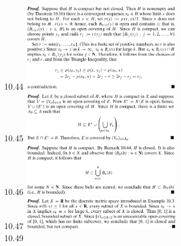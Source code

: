 \documentclass[8pt,landscape]{article}
\begin{document}
\begin{multicols}{3}
    10.44
    \includegraphics[width=250]{10_44.png} \\
    10.45
    \includegraphics[width=250]{10_45.png} \\
    10.46
    \includegraphics[width=250]{10_46.png} \\
    10.47
    \includegraphics[width=250]{10_47.png} \\
    10.49

\end{multicols}
\end{document}

